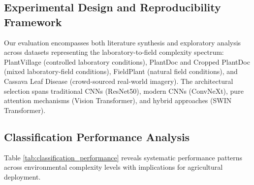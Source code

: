 \documentclass[sn-mathphys]{sn-jnl}
\theoremstyle{thmstyleone}%
\theoremstyle{thmstyletwo}%
\theoremstyle{thmstylethree}%
\begin{document}
\subsection{Experimental Design and Reproducibility Framework}

Our evaluation encompasses both literature synthesis and exploratory analysis across datasets representing the laboratory-to-field complexity spectrum: PlantVillage (controlled laboratory conditions), PlantDoc and Cropped PlantDoc (mixed laboratory-field conditions), FieldPlant (natural field conditions), and Cassava Leaf Disease (crowd-sourced real-world imagery). The architectural selection spans traditional CNNs (ResNet50), modern CNNs (ConvNeXt), pure attention mechanisms (Vision Transformer), and hybrid approaches (SWIN Transformer).



\subsection{Classification Performance Analysis}

Table \ref{tab:classification_performance} reveals systematic performance patterns across environmental complexity levels with implications for agricultural deployment. 
\end{document}
